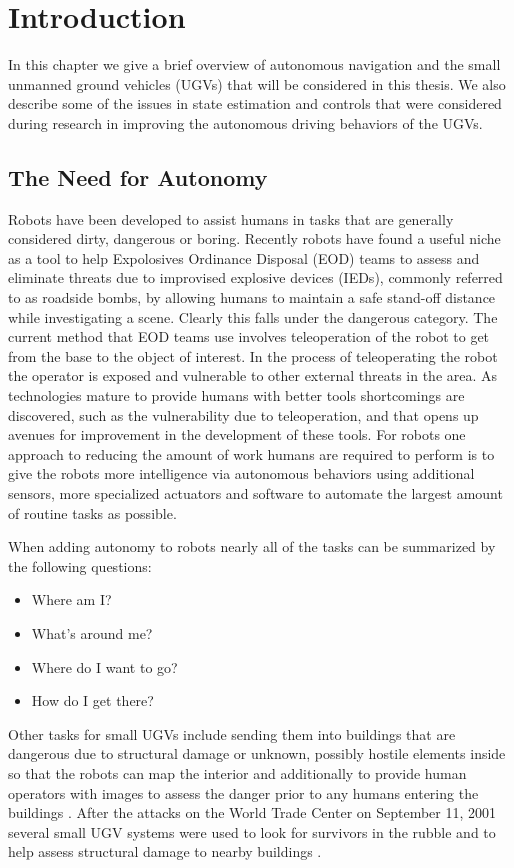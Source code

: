 \chapter{Introduction}
\label{ch:introduction}
In this chapter we give a brief overview of autonomous navigation and the small unmanned ground vehicles (UGVs) that will be considered in this thesis. We also describe some of the issues in state estimation and controls that were considered during research in improving the autonomous driving behaviors of the UGVs.

\section{The Need for Autonomy}
\label{sec:needforautonomy}
Robots have been developed to assist humans in tasks that are generally considered dirty, dangerous or boring. Recently robots have found a useful niche as a tool to help Expolosives Ordinance Disposal (EOD) teams to assess and eliminate threats due to improvised explosive devices (IEDs), commonly referred to as roadside bombs, by allowing humans to maintain a safe stand-off distance while investigating a scene. Clearly this falls under the dangerous category. The current method that EOD teams use involves teleoperation of the robot to get from the base to the object of interest. In the process of teleoperating the robot the operator is exposed and vulnerable to other external threats in the area. As technologies mature to provide humans with better tools shortcomings are discovered, such as the vulnerability due to teleoperation, and that opens up avenues for improvement in the development of these tools. For robots one approach to reducing the amount of work humans are required to perform is to give the robots more intelligence via autonomous behaviors using additional sensors, more specialized actuators and software to automate the largest amount of routine tasks as possible.

When adding autonomy to robots nearly all of the tasks can be summarized by the following questions:
\begin{itemize}
\item Where am I?
\item What's around me?
\item Where do I want to go?
\item How do I get there?
\end{itemize}

Other tasks for small UGVs include sending them into buildings that are dangerous due to structural damage or unknown, possibly hostile elements inside so that the robots can map the interior and additionally to provide human operators with images to assess the danger prior to any humans entering the buildings \cite{CongressUGV06}. After the attacks on the World Trade Center on September 11, 2001 several small UGV systems were used to look for survivors in the rubble and to help assess structural damage to nearby buildings \cite{Everett02}.

